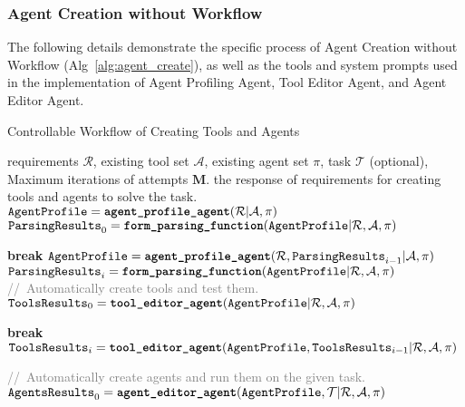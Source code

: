 \subsubsection{Agent Creation without Workflow}\label{sec:agent_app}
The following details demonstrate the specific process of Agent Creation without Workflow (Alg~\ref{alg:agent_create}), as well as the tools and system prompts used in the implementation of Agent Profiling Agent, Tool Editor Agent, and Agent Editor Agent.
\begin{breakablealgorithm}
   \caption{Controllable Workflow of Creating Tools and Agents }
   \label{alg:agent_create}
\begin{algorithmic}[1]
    requirements $\mathcal{R}$, existing tool set $\mathcal{A}$, existing agent set $\mathcal{\pi}$, task $\mathcal{T}$ (optional), Maximum iterations of attempts $\mathbf{M}$.
    the response of requirements for creating tools and agents to solve the task.
   \STATE $\texttt{AgentProfile} = \textbf{\texttt{agent\_profile\_agent}}(\mathcal{R}| \mathcal{A}, \mathcal{\pi})$
   \STATE $\texttt{ParsingResults}_0  = \textbf{\texttt{form\_parsing\_function}}(\texttt{AgentProfile}| \mathcal{R}, \mathcal{A}, \mathcal{\pi})$
   
   \STATE \textbf{break} 
   \ELSE
   \STATE $\texttt{AgentProfile} = \textbf{\texttt{agent\_profile\_agent}}(\mathcal{R}, \texttt{ParsingResults}_{i-1}| \mathcal{A}, \mathcal{\pi})$
   \STATE $\texttt{ParsingResults}_i  = \textbf{\texttt{form\_parsing\_function}}(\texttt{AgentProfile}| \mathcal{R}, \mathcal{A}, \mathcal{\pi})$
   \ENDIF
   \ENDFOR
   \STATE \textcolor{gray}{//~Automatically create tools and test them.}
   \STATE $\texttt{ToolsResults}_0 = \textbf{\texttt{tool\_editor\_agent}}(\texttt{AgentProfile}| \mathcal{R}, \mathcal{A}, \mathcal{\pi})$
   
   \STATE \textbf{break} 
   \ELSE
   \STATE $\texttt{ToolsResults}_i = \textbf{\texttt{tool\_editor\_agent}}(\texttt{AgentProfile}, \texttt{ToolsResults}_{i-1}| \mathcal{R}, \mathcal{A}, \mathcal{\pi})$
   \ENDIF
   \ENDFOR
   \ENDIF

    \STATE \textcolor{gray}{//~Automatically create agents and run them on the given task.}
   \STATE $\texttt{AgentsResults}_0 = \textbf{\texttt{agent\_editor\_agent}}(\texttt{AgentProfile}, \mathcal{T}| \mathcal{R}, \mathcal{A}, \mathcal{\pi})$ 
   

\end{algorithmic}
\end{breakablealgorithm}
